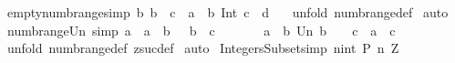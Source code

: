 \begin{isabellebody}
\isanewline
%
\endisadelimproof
\isanewline
{}\isamarkupfalse%
\ empty{\isacharunderscore}numb{\isacharunderscore}range{\isacharbrackleft}simp{\isacharbrackright}{\isacharcolon}\ {\isachardoublequoteopen}{\isacharbang}{\isacharbang}b{\isachardot}\ b\ {\isacharless}\ c\ {\isacharequal}{\isacharequal}{\isachargreater}\ {\isacharparenleft}{\isacharparenleft}{\isacharparenleft}a\ {\isachardot}{\isachardot}\ b{\isacharparenright}\ Int\ {\isacharparenleft}c\ {\isachardot}{\isachardot}\ d{\isacharparenright}{\isacharparenright}{\isacharparenright}\ {\isacharequal}\ {\isacharbraceleft}{\isacharbraceright}{\isachardoublequoteclose}\isanewline
%
\isadelimproof
%
\endisadelimproof
%
\isatagproof
{}\isamarkupfalse%
\ {\isacharparenleft}unfold\ numb{\isacharunderscore}range{\isacharunderscore}def{\isacharparenright}\isanewline
{}\isamarkupfalse%
\ auto\isanewline
{}\isamarkupfalse%
%
\endisatagproof
{\isafoldproof}%
%
\isadelimproof
\isanewline
%
\endisadelimproof
\isanewline
\isanewline
{}\isamarkupfalse%
\ numb{\isacharunderscore}range{\isacharunderscore}Un\ {\isacharbrackleft}simp{\isacharbrackright}{\isacharcolon}\ {\isachardoublequoteopen}{\isacharbang}{\isacharbang}a{\isachardot}\ {\isacharbrackleft}{\isacharbar}\ a\ {\isacharless}{\isacharequal}\ {\isacharparenleft}b\ {\isacharplus}\ {}{\isacharparenright}{\isacharsemicolon}\ b\ {\isacharless}{\isacharequal}\ c\ {\isacharbar}{\isacharbrackright}\ {\isacharequal}{\isacharequal}{\isachargreater}\ \ \isanewline
\ \ \ {\isacharparenleft}{\isacharparenleft}a\ {\isachardot}{\isachardot}\ b{\isacharparenright}\ Un\ {\isacharparenleft}b\ {\isacharplus}\ {}\ {\isachardot}{\isachardot}\ c{\isacharparenright}{\isacharparenright}\ {\isacharequal}\ {\isacharparenleft}a\ {\isachardot}{\isachardot}\ c{\isacharparenright}{\isachardoublequoteclose}\isanewline
%
\isadelimproof
%
\endisadelimproof
%
\isatagproof
{}\isamarkupfalse%
\ {\isacharparenleft}unfold\ numb{\isacharunderscore}range{\isacharunderscore}def\ zsuc{\isacharunderscore}def{\isacharparenright}\isanewline
{}\isamarkupfalse%
\ auto\isanewline
{}\isamarkupfalse%
%
\endisatagproof
{\isafoldproof}%
%
\isadelimproof
%
\endisadelimproof
%
\isamarkuptrue%
\isamarkupfalse%
\ Integers{\isacharunderscore}Subset{\isacharbrackleft}simp{\isacharbrackright}{\isacharcolon}\ {\isachardoublequoteopen}{\isacharbraceleft}{\isacharparenleft}n{\isacharcolon}{\isacharcolon}int{\isacharparenright}{\isachardot}\ {\isacharparenleft}P\ n{\isacharparenright}{\isacharbraceright}{\isacharless}{\isacharequal}\ {\isacharpercent}Z{\isachardoublequoteclose}\isanewline

\end{isabellebody}
